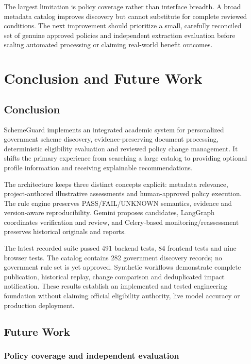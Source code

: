\documentclass[12pt,a4paper,twoside]{report}
\begin{document}
The largest limitation is policy coverage rather than interface breadth. A broad metadata catalog improves discovery but cannot substitute for complete reviewed conditions. The next improvement should prioritize a small, carefully reconciled set of genuine approved policies and independent extraction evaluation before scaling automated processing or claiming real-world benefit outcomes.

\clearpage\chapter{Conclusion and Future Work}

\section{Conclusion}

SchemeGuard implements an integrated academic system for personalized government scheme discovery, evidence-preserving document processing, deterministic eligibility evaluation and reviewed policy change management. It shifts the primary experience from searching a large catalog to providing optional profile information and receiving explainable recommendations.

The architecture keeps three distinct concepts explicit: metadata relevance, project-authored illustrative assessments and human-approved policy execution. The rule engine preserves PASS/FAIL/UNKNOWN semantics, evidence and version-aware reproducibility. Gemini proposes candidates, LangGraph coordinates verification and review, and Celery-based monitoring/reassessment preserves historical originals and reports.

The latest recorded suite passed 491 backend tests, 84 frontend tests and nine browser tests. The catalog contains 282 government discovery records; no government rule set is yet approved. Synthetic workflows demonstrate complete publication, historical replay, change comparison and deduplicated impact notification. These results establish an implemented and tested engineering foundation without claiming official eligibility authority, live model accuracy or production deployment.

\section{Future Work}

\subsection*{Policy coverage and independent evaluation}
\end{document}
